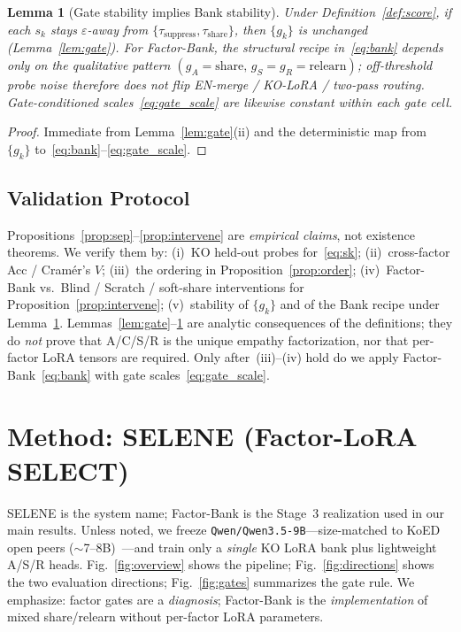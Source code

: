 \documentclass[journal]{IEEEtran}
\newtheorem{lemma}{Lemma}
\begin{document}
\begin{lemma}[Gate stability implies Bank stability]
\label{lem:init}
Under Definition~\ref{def:score}, if each $s_k$ stays $\varepsilon$-away from $\{\tau_{\mathrm{suppress}},\tau_{\mathrm{share}}\}$, then $\{g_k\}$ is unchanged (Lemma~\ref{lem:gate}).
For Factor-Bank, the structural recipe in~\eqref{eq:bank} depends only on the qualitative pattern $(g_A{=}\mathrm{share},\,g_S{=}g_R{=}\mathrm{relearn})$; off-threshold probe noise therefore does not flip EN-merge / KO-LoRA / two-pass routing.
Gate-conditioned scales~\eqref{eq:gate_scale} are likewise constant within each gate cell.
\end{lemma}
\begin{proof}
Immediate from Lemma~\ref{lem:gate}(ii) and the deterministic map from $\{g_k\}$ to~\eqref{eq:bank}--\eqref{eq:gate_scale}.
\end{proof}

\subsection{Validation Protocol}
Propositions~\ref{prop:sep}--\ref{prop:intervene} are \emph{empirical claims}, not existence theorems.
We verify them by: (i)~KO held-out probes for~\eqref{eq:sk}; (ii)~cross-factor Acc / Cram\'{e}r's $V$; (iii)~the ordering in Proposition~\ref{prop:order}; (iv)~Factor-Bank vs.\ Blind / Scratch / soft-share interventions for Proposition~\ref{prop:intervene}; (v)~stability of $\{g_k\}$ and of the Bank recipe under Lemma~\ref{lem:init}.
Lemmas~\ref{lem:gate}--\ref{lem:init} are analytic consequences of the definitions; they do \emph{not} prove that A/C/S/R is the unique empathy factorization, nor that per-factor LoRA tensors are required.
Only after~(iii)--(iv) hold do we apply Factor-Bank~\eqref{eq:bank} with gate scales~\eqref{eq:gate_scale}.

\section{Method: SELENE (Factor-LoRA SELECT)}
SELENE is the system name; Factor-Bank is the Stage~3 realization used in our main results.
Unless noted, we freeze \texttt{Qwen/Qwen3.5-9B}---size-matched to KoED open peers ($\sim$7--8B)~\cite{lee2025koed}---and train only a \emph{single} KO LoRA bank plus lightweight A/S/R heads.
Fig.~\ref{fig:overview} shows the pipeline; Fig.~\ref{fig:directions} shows the two evaluation directions; Fig.~\ref{fig:gates} summarizes the gate rule.
We emphasize: factor gates are a \emph{diagnosis}; Factor-Bank is the \emph{implementation} of mixed share/relearn without per-factor LoRA parameters.
\end{document}
